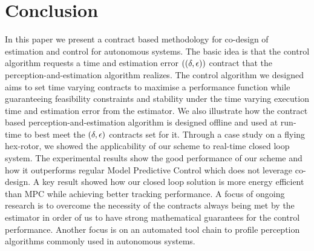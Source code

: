 \section{Conclusion}
\label{conclusion}

In this paper we present a contract based methodology for co-design of estimation and control for autonomous systems. The basic idea is that the control algorithm requests a time and estimation error $((\delta,\epsilon))$ contract that the perception-and-estimation algorithm realizes. The control algorithm we designed aims to set time varying contracts to maximise a performance function while guaranteeing feasibility constraints and stability under the time varying execution time and estimation error from the estimator. We also illustrate how the contract based perception-and-estimation algorithm is designed offline and used at run-time to best meet the $(\delta,\epsilon)$ contracts set for it. Through a case study on a flying hex-rotor, we showed the applicability of our scheme to real-time closed loop system. The experimental results show the good performance of our scheme and how it outperforms regular Model Predictive Control which does not leverage co-design. A key result showed how our closed loop solution is more energy efficient than MPC while achieving better tracking performance. A focus of ongoing research is to overcome the necessity of the contracts always being met by the estimator in order of us to have strong mathematical guarantees for the control performance. Another focus is on an automated tool chain to profile perception algorithms commonly used in autonomous systems.